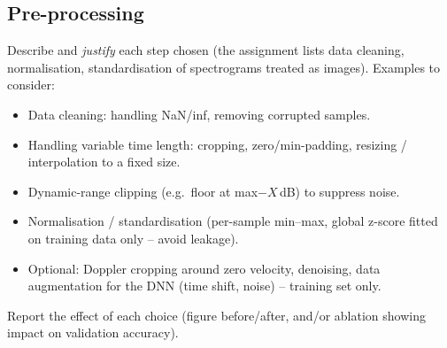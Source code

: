 \documentclass[10pt,a4paper,titlepage]{article}
\newcommand{\placeholder}[1]{\begin{placeholderbox}#1\end{placeholderbox}}
\begin{document}
\subsection{Pre-processing}
\placeholder{%
Describe and \emph{justify} each step chosen (the assignment lists data
cleaning, normalisation, standardisation of spectrograms treated as images).
Examples to consider:
\begin{itemize}
  \item Data cleaning: handling NaN/inf, removing corrupted samples.
  \item Handling variable time length: cropping, zero/min-padding, resizing /
        interpolation to a fixed size.
  \item Dynamic-range clipping (e.g.\ floor at max$-X$\,dB) to suppress noise.
  \item Normalisation / standardisation (per-sample min--max, global z-score
        fitted on training data only -- avoid leakage).
  \item Optional: Doppler cropping around zero velocity, denoising, data
        augmentation for the DNN (time shift, noise) -- training set only.
\end{itemize}
Report the effect of each choice (figure before/after, and/or ablation
showing impact on validation accuracy).}
\end{document}
